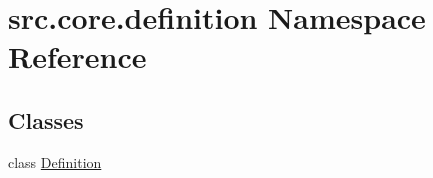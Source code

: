 \hypertarget{namespacesrc_1_1core_1_1definition}{\section{src.\+core.\+definition Namespace Reference}
\label{namespacesrc_1_1core_1_1definition}
}
\subsection*{Classes}
\begin{DoxyCompactItemize}
\item 
class \hyperlink{classsrc_1_1core_1_1definition_1_1_definition}{Definition}
\end{DoxyCompactItemize}
